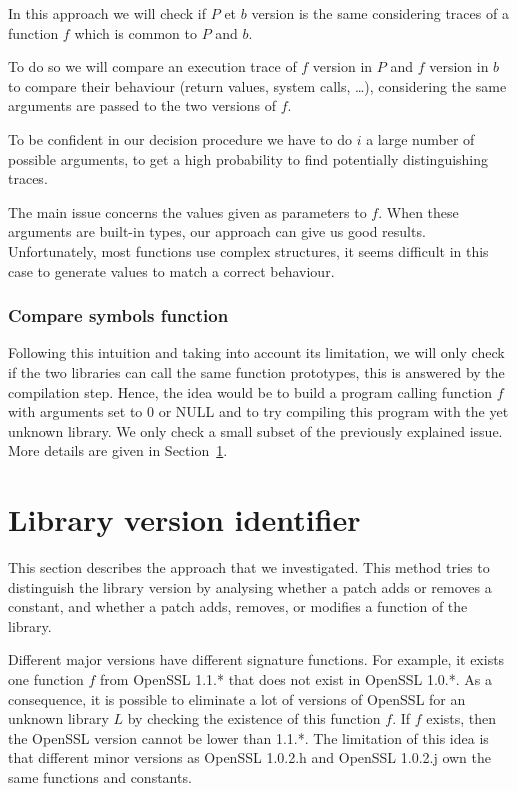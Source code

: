 \documentclass{article}
\begin{document}
    In this approach we will check if $P$ et $b$ version is the same
    considering traces of a function $f$ which is common to $P$ and $b$.

    To do so we will compare an execution trace of $f$
    version in $P$ and $f$ version in $b$ to compare their behaviour (return
    values, system calls, \dots),
    considering the same arguments are passed to the two versions of $f$. 

    To be confident in our decision procedure we have to do $i$ a large number
    of possible arguments, to get a high probability to find potentially distinguishing
    traces.

    The main issue concerns the values given as parameters to $f$. When these arguments
    are built-in types, our approach can give us good results. Unfortunately,
    most functions use complex structures, it seems difficult in this case to
    generate values to match a correct behaviour.
	
	\subsubsection{Compare symbols function}
	
    Following this intuition and taking into account its limitation, we will
    only check if the two libraries can call the same function prototypes,
    this is answered by the compilation step.
    Hence, the idea would be to build a program calling function $f$ with
    arguments set to $0$ or NULL and to try compiling this program with the
    yet unknown library. We only check a small subset of the previously explained
    issue. More details are given in Section~\ref{section:libraryChecker}.

\section{Library version identifier}
\label{section:libraryChecker}

    This section describes the approach that we investigated. This method
    tries to distinguish the library version by analysing whether a patch adds
    or removes a constant, and whether a patch adds, removes, or modifies a
    function of the library.
	   
    Different major versions have different signature functions. For example,
    it exists one function $f$ from OpenSSL 1.1.* that does not exist in
    OpenSSL 1.0.*. As a consequence, it is possible to eliminate a lot of
    versions of OpenSSL for an unknown library $L$ by checking the existence
    of this function $f$. If $f$ exists, then the OpenSSL version cannot be
    lower than 1.1.*. The limitation of this idea is that different minor
    versions as OpenSSL 1.0.2.h and OpenSSL 1.0.2.j own the same functions and
    constants.
   
\end{document}

